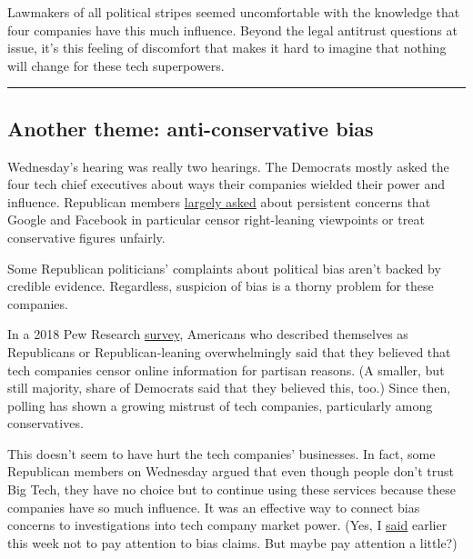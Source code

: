 Lawmakers of all political stripes seemed uncomfortable with the
knowledge that four companies have this much influence. Beyond the legal
antitrust questions at issue, it's this feeling of discomfort that makes
it hard to imagine that nothing will change for these tech superpowers.

\begin{center}\rule{0.5\linewidth}{\linethickness}\end{center}

\hypertarget{another-theme-anti-conservative-bias}{%
\subsection{Another theme: anti-conservative
bias}\label{another-theme-anti-conservative-bias}}

Wednesday's hearing was really two hearings. The Democrats mostly asked
the four tech chief executives about ways their companies wielded their
power and influence. Republican members
\href{https://www.nytimes3xbfgragh.onion/live/2020/07/29/technology/tech-ceos-hearing-testimony/republicans-focused-on-bias-concerns-about-platforms}{largely
asked} about persistent concerns that Google and Facebook in particular
censor right-leaning viewpoints or treat conservative figures unfairly.

Some Republican politicians' complaints about political bias aren't
backed by credible evidence. Regardless, suspicion of bias is a thorny
problem for these companies.

In a 2018 Pew Research
\href{https://www.pewresearch.org/fact-tank/2020/05/29/fast-facts-about-americans-views-of-social-media-companies-as-trump-twitter-dispute-grows/}{survey},
Americans who described themselves as Republicans or Republican-leaning
overwhelmingly said that they believed that tech companies censor online
information for partisan reasons. (A smaller, but still majority, share
of Democrats said that they believed this, too.) Since then, polling has
shown a growing mistrust of tech companies, particularly among
conservatives.

This doesn't seem to have hurt the tech companies' businesses. In fact,
some Republican members on Wednesday argued that even though people
don't trust Big Tech, they have no choice but to continue using these
services because these companies have so much influence. It was an
effective way to connect bias concerns to investigations into tech
company market power. (Yes, I
\href{https://www.nytimes3xbfgragh.onion/2020/07/29/technology/congress-big-tech.html}{said}
earlier this week not to pay attention to bias claims. But maybe pay
attention a little?)

